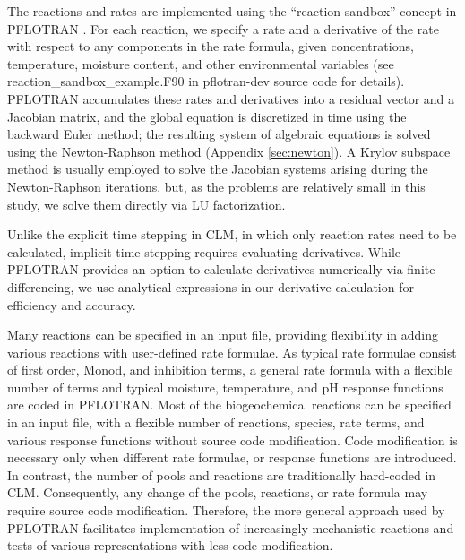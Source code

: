 \documentclass[gmd, manuscript]{copernicus}
\begin{document}
The reactions and rates are implemented using the ``reaction sandbox'' concept
in PFLOTRAN \citep{Lichtner2015}. For each reaction, we specify a rate and a
derivative of the rate with respect to any components in the rate formula,
given concentrations, temperature, moisture content, and other environmental
variables (see reaction\_sandbox\_example.F90 in pflotran-dev source code for
details). PFLOTRAN accumulates these rates and derivatives into a residual
vector and a Jacobian matrix, and the global equation is discretized in time
using the backward Euler method; the resulting system of algebraic 
equations is solved using the Newton-Raphson method (Appendix \ref{sec:newton}).
A Krylov subspace method is usually employed to solve the Jacobian 
systems arising during the Newton-Raphson iterations, but, as the problems are 
relatively small in this study, we solve them directly via LU factorization.

Unlike the explicit time stepping in CLM, in which only reaction rates need to be
calculated, implicit time stepping requires evaluating derivatives.  While PFLOTRAN
provides an option to calculate derivatives numerically via finite-differencing, we use analytical expressions in our 
derivative calculation for efficiency and accuracy. 

Many reactions can be specified in an input file, providing flexibility in
adding various reactions with user-defined rate formulae. As typical rate
formulae consist of first order, Monod, and inhibition terms, a general rate
formula with a flexible number of terms and typical moisture, temperature, and pH
response functions are coded in PFLOTRAN. Most of the biogeochemical reactions
can be specified in an input file, with a flexible number of reactions, species,
rate terms, and various response functions without source code modification.
Code modification is necessary only when different rate formulae, or response
functions are introduced. In contrast, the number of pools and reactions are
traditionally hard-coded in CLM. Consequently, any change of the pools,
reactions, or rate formula may require source code modification. Therefore,
the more general approach used by PFLOTRAN facilitates implementation of increasingly mechanistic
reactions and tests of various representations with less code modification.
\end{document}
